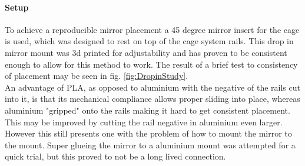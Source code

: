 \documentclass[twoside,openright]{scrreprt}
\begin{document}
\paragraph{Setup}
To achieve a reproducible mirror placement a 45 degree mirror insert for the cage is used, which was designed to rest on top of the cage system rails. This drop in mirror mount was 3d printed for adjustability and has proven to be consistent enough to allow for this method to work. The result of a brief test to consistency of placement may be seen in fig. \ref{fig:DropinStudy}. \\
An advantage of PLA, as opposed to aluminium with the negative of the rails cut into it, is that its mechanical compliance allows proper sliding into place, whereas aluminium "gripped" onto the rails making it hard to get consistent placement. This may be improved by cutting the rail negative in aluminium even larger. However this still presents one with the problem of how to mount the mirror to the mount. Super glueing  the mirror to a aluminium mount was attempted for a quick trial, but this proved to not be a long lived connection.\\
\end{document}
